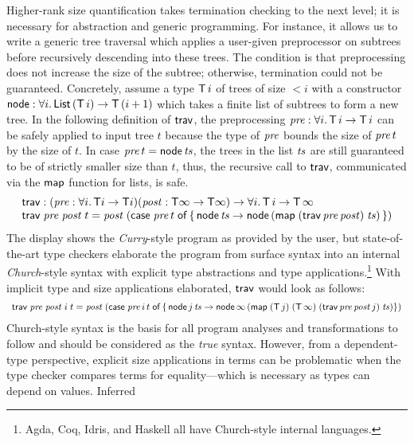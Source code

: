 \documentclass[acmlarge,review,anonymous]{acmart}\settopmatter{printfolios=true}
\begin{document}
Higher-rank size quantification takes termination checking to the next level; it is necessary for abstraction and generic programming.  For instance, it allows us to write a generic tree traversal which applies a user-given preprocessor on subtrees before recursively descending into these trees.  The condition is that preprocessing does not increase the size of the subtree; otherwise, termination could not be guaranteed.  Concretely, assume a type $\mathsf{T}\,i$ of trees of size $< i$ with a constructor $\mathsf{node} : \forall i.\, \mathsf{List}\,(\mathsf{T}\,i) \to \mathsf{T}\,(i+1)$ which takes a finite list of subtrees to form a new tree.
In the following definition of $\mathsf{trav}$, the preprocessing $\mathit{pre} : \forall i.\, \mathsf{T}\,i \to \mathsf{T}\,i$ can be safely applied to input tree $t$ because the type of $\mathit{pre}$ bounds the size of $\mathit{pre}\,t$ by the size of $t$.
In case $\mathit{pre}\,t = \mathsf{node}\,\mathit{ts}$, the trees in the list $\mathit{ts}$ are still guaranteed to be of strictly smaller size than $t$, thus, the recursive call to $\mathsf{trav}$, communicated via the $\mathsf{map}$ function for lists, is safe.
\[
\begin{array}{l}
  \mathsf{trav} : (\mathit{pre} : \forall i.\, \mathsf{T} i \to \mathsf{T} i) (\mathit{post} : \mathsf{T} \infty \to \mathsf{T} \infty) \to \forall i.\, \mathsf{T}\,i \to \mathsf{T}\,\infty
  \\
  \mathsf{trav} \; \mathit{pre} \; \mathit{post} \; t = \mathit{post}\;(\mathsf{case}\;\mathit{pre}\,t\;\mathsf{of} \, \{ \, \mathsf{node}\,\mathit{ts} \to \mathsf{node}\,(\mathsf{map} \; (\mathsf{trav} \, \mathit{pre} \, \mathit{post}) \; \mathit{ts})\, \})
\end{array}
\]
The display shows the \emph{Curry}-style program as provided by the user, but state-of-the-art type checkers elaborate the program from surface syntax into an internal \emph{Church}-style syntax with explicit type abstractions and type applications.\footnote{Agda, Coq, Idris, and Haskell \cite{sulzmannChakravartyPeythonJonesDonnelly:tldi07} all have Church-style internal languages.}  With implicit type and size applications elaborated, $\mathsf{trav}$ would look as follows:
\[
\begin{array}{l}
  \mathsf{trav} \; \mathit{pre} \; \mathit{post} \; i\; t = \mathit{post}\;(\mathsf{case}\;\mathit{pre}\,i\,t\;\mathsf{of} \, \{ \, \mathsf{node}\,j\,\mathit{ts} \to \mathsf{node}\,\infty\,(\mathsf{map} \; (\mathsf{T}\,j) \; (\mathsf{T}\,\infty) \; (\mathsf{trav} \, \mathit{pre} \, \mathit{post} \, j) \; \mathit{ts}) \})
\end{array}
\]
Church-style syntax is the basis for all program analyses and transformations to follow and should be considered as the \emph{true} syntax.
However, from a dependent-type perspective, explicit size applications
in terms can be problematic when the type checker compares terms for
equality---which is necessary as types can depend on values.  Inferred
\end{document}
